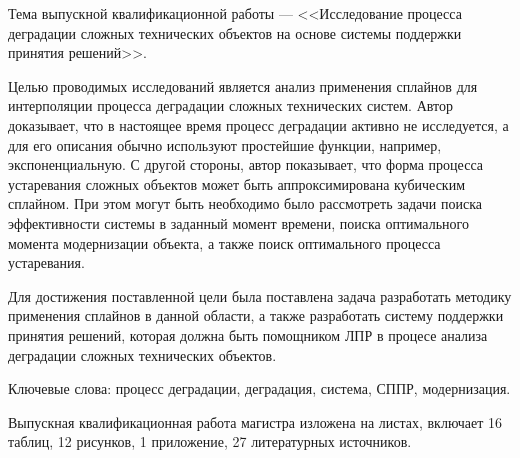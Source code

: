 
Тема выпускной квалификационной работы --- <<Исследование процесса деградации сложных технических объектов на основе системы поддержки принятия решений>>.

Целью проводимых исследований является анализ применения сплайнов для интерполяции процесса деградации сложных технических систем.
Автор доказывает, что в настоящее время процесс деградации активно не исследуется, а для его описания обычно используют простейшие функции, например, экспоненциальную.
С другой стороны, автор показывает, что форма процесса устаревания сложных объектов может быть аппроксимирована кубическим сплайном.
При этом могут быть необходимо было рассмотреть задачи поиска эффективности системы в заданный момент времени, поиска оптимального момента модернизации объекта,
а также поиск оптимального процесса устаревания.

Для достижения поставленной цели была поставлена задача разработать методику применения сплайнов в данной области, 
а также разработать систему поддержки принятия решений, которая должна быть помощником ЛПР в процесе анализа деградации сложных технических объектов.

Ключевые слова: процесс деградации, деградация, система, СППР, модернизация.

Выпускная квалификационная работа магистра изложена на \pageref{LastPage} листах, включает 16 таблиц, 12 рисунков, 1 приложение, 27 литературных источников.

\clearpage
